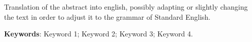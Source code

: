 
\begin{resumo}[Abstract]

    Translation of the abstract into english, possibly adapting or slightly changing the text in order to adjust it to the grammar of Standard English.

    \par\vspace{\baselineskip}

    \textbf{Keywords}: Keyword 1; Keyword 2; Keyword 3; Keyword 4.
\end{resumo}


